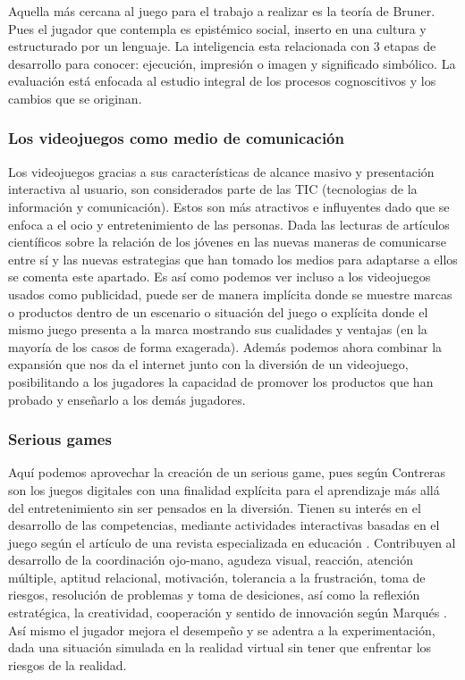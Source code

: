 Aquella más cercana al juego para el trabajo a realizar es la teoría de Bruner. Pues el jugador que contempla es epistémico social, inserto en una cultura y estructurado por un lenguaje. La inteligencia esta relacionada con 3 etapas de desarrollo para conocer: ejecución, impresión o imagen y significado simbólico. La evaluación está enfocada al estudio integral de los procesos cognoscitivos y los cambios que se originan.


\subsubsection{Los videojuegos como medio de comunicación}
Los videojuegos gracias a sus características de alcance masivo y presentación interactiva al usuario, son considerados parte de las TIC (tecnologias de la información y comunicación). Estos son más atractivos e influyentes dado que se enfoca a el ocio y entretenimiento de las personas. Dada las lecturas de artículos científicos sobre la relación de los jóvenes en las nuevas maneras de comunicarse entre sí \cite{castellana2007adolescente} y las nuevas estrategias que han tomado los medios para adaptarse a ellos \cite{ignasidebofarull2005} se comenta este apartado. 
Es así como podemos ver incluso a los videojuegos usados como publicidad, puede ser de manera implícita donde se muestre marcas o productos dentro de un escenario o situación del juego o explícita donde el mismo juego presenta a la marca mostrando sus cualidades y ventajas (en la mayoría de los casos de forma exagerada). Además podemos ahora combinar la expansión que nos da el internet junto con la diversión de un videojuego, posibilitando a los jugadores la capacidad de promover los productos que han probado y enseñarlo a los demás jugadores. 


\subsubsection{Serious games}
Aquí podemos aprovechar la creación de un serious game, pues según Contreras \cite{contreras2016investigacion} son los juegos digitales con una finalidad explícita para el aprendizaje más allá del entretenimiento sin ser pensados en la diversión. Tienen su interés en el desarrollo de las competencias, mediante actividades interactivas basadas en el juego según el artículo de una revista especializada en educación \cite{romero2015serious}.
Contribuyen al desarrollo de la coordinación ojo-mano, agudeza visual, reacción, atención múltiple, aptitud relacional, motivación, tolerancia a la frustración, toma de riesgos, resolución de problemas y toma de desiciones, así como la reflexión estratégica, la creatividad, cooperación y sentido de innovación según Marqués \cite{marques2012}. Así mismo el jugador mejora el desempeño y se adentra a la experimentación, dada una situación simulada en la realidad virtual sin tener que enfrentar los riesgos de la realidad. 
 

